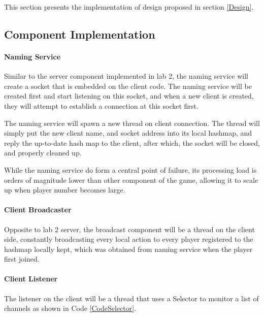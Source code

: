  \label{Impl}

This section presents the implementation of design proposed in section \ref{Design}.

\subsection*{Component Implementation}\label{ImplComponent}

\paragraph*{Naming Service}

Similar to the server component implemented in lab 2, the naming service will create a socket that is embedded on the client code. The naming service will be created first and start listening on this socket, and when a new client is created, they will attempt to establish a connection at this socket first.

The naming service will spawn a new thread on client connection. The thread will simply put the new client name, and socket address into its local hashmap, and reply the up-to-date hash map to the client, after which, the socket will be closed, and properly cleaned up.

While the naming service do form a central point of failure, its processing load is orders of magnitude lower than other component of the game, allowing it to scale up when player number becomes large.

\paragraph*{Client Broadcaster}

Opposite to lab 2 server, the broadcast component will be a thread on the client side, constantly broadcasting every local action to every player registered to the hashmap locally kept, which was obtained from naming service when the player first joined.

\paragraph*{Client Listener}

The listener on the client will be a thread that uses a Selector to monitor a list of channels as shown in Code \ref{CodeSelector}. 

